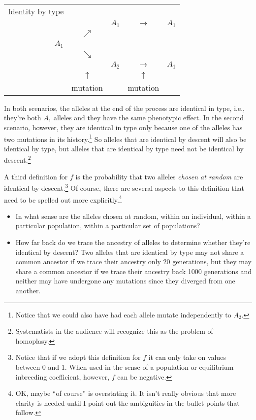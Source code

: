 \documentclass[12pt]{article}
\begin{document}
\begin{center}
\begin{tabular}{rcccc}
Identity by type \\
      &            & $A_1$ & $\rightarrow$ & $A_1$ \\
      & $\nearrow$ &       &               & \\
$A_1$ &            &       &               & \\
      & $\searrow$ &       &               & \\
      &            & $A_2$ & $\rightarrow$ & $A_1$ \\
      & $\uparrow$ &       & $\uparrow$    & \\
      & mutation   &       & mutation      & 
\end{tabular}
\end{center}

In both scenarios, the alleles at the end of the process are identical
in type, i.e., they're both $A_1$ alleles and they have the same
phenotypic effect. In the second scenario, however, they are identical
in type only because one of the alleles has two mutations in its
history.\footnote{Notice that we could also have had each allele
  mutate independently to $A_2$.} So alleles that are identical by
descent will also be identical by type, but alleles that are identical
by type need not be identical by descent.\footnote{Systematists in the
  audience will recognize this as the problem of homoplasy.}

A third definition for $f$ is the probability that two alleles {\it
chosen at random\/} are identical by descent.\footnote{Notice that if
we adopt this definition for $f$ it can only take on values between 0
and 1. When used in the sense of a population or equilibrium
inbreeding coefficient, however, $f$ can be negative.}  Of course,
there are several aspects to this definition that need to be spelled
out more explicitly.\footnote{OK, maybe ``of course'' is overstating
  it. It isn't really obvious that more clarity is needed until I
  point out the ambiguities in the bullet points that follow.}

\begin{itemize}

\item In what sense are the alleles chosen at random, within an
individual, within a particular population, within a particular set of
populations? 

\item How far back do we trace the ancestry of alleles to determine
whether they're identical by descent? Two alleles that are identical
by type may not share a common ancestor if we trace their ancestry
only 20 generations, but they may share a common ancestor if we trace
their ancestry back 1000 generations and neither may have undergone
any mutations since they diverged from one another.

\end{itemize}
\end{document}

